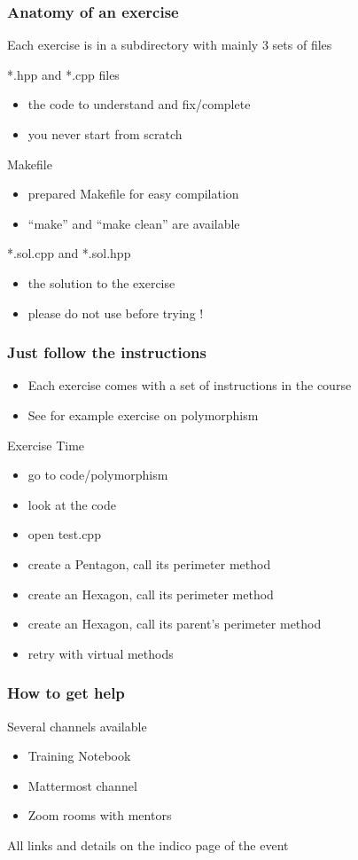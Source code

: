 \documentclass[compress]{beamer}
\begin{document}
\begin{frame}
  \frametitle{Anatomy of an exercise}
  Each exercise is in a subdirectory with mainly 3 sets of files
  \begin{exampleblock}{*.hpp and *.cpp files}
    \begin{itemize}
    \item the code to understand and fix/complete
    \item you never start from scratch
    \end{itemize}
  \end{exampleblock}
  \begin{block}{Makefile}
    \begin{itemize}
    \item prepared Makefile for easy compilation
    \item ``make'' and ``make clean'' are available
    \end{itemize}
  \end{block}
  \begin{alertblock}{*.sol.cpp and *.sol.hpp}
    \begin{itemize}
    \item the solution to the exercise
    \item please do not use before trying !
    \end{itemize}
  \end{alertblock}
\end{frame}

\begin{frame}
  \frametitle{Just follow the instructions}
  \begin{itemize}
  \item Each exercise comes with a set of instructions in the course
  \item See for example exercise on polymorphism
  \end{itemize}
  \begin{alertblock}{Exercise Time}
    \begin{itemize}
    \item go to code/polymorphism
    \item look at the code
    \item open test.cpp
    \item create a Pentagon, call its perimeter method
    \item create an Hexagon, call its perimeter method
    \item create an Hexagon, call its parent's perimeter method
    \item retry with virtual methods
    \end{itemize}
  \end{alertblock}
\end{frame}

\begin{frame}
  \frametitle{How to get help}
  \Large Several channels available
  \begin{itemize}
  \item Training Notebook
  \item Mattermost channel
  \item Zoom rooms with mentors
  \end{itemize}
  All links and details on the indico page of the event
\end{frame}
\end{document}
